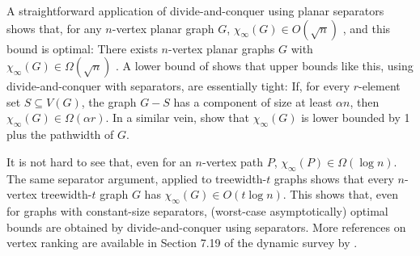 \documentclass[kpfonts]{patmorin}
\theoremstyle{named}
\begin{document}
A straightforward application of divide-and-conquer using planar separators shows that, for any $n$-vertex planar graph $G$, $\chi_\infty(G) \in O(\sqrt{n})$ \cite{llewellyn.tovey.ea:local,katchalski.mccuaig.ea:ordered}, and this bound is optimal:  There exists $n$-vertex planar graphs $G$ with $\chi_\infty(G)\in \Omega(\sqrt{n})$ \cite{katchalski.mccuaig.ea:ordered}.  A lower bound of \citet{katchalski.mccuaig.ea:ordered} shows that upper bounds like this, using divide-and-conquer with separators, are essentially tight: If, for every $r$-element set $S\subseteq V(G)$, the graph $G-S$ has a component of size at least $\alpha n$, then $\chi_\infty(G) \in\Omega(\alpha r)$. In a similar vein, \citet{bodlaender.gilbert.ea:approximating,kloks:treewidth} show that $\chi_\infty(G)$ is lower bounded by 1 plus the pathwidth of $G$.

It is not hard to see that, even for an $n$-vertex path $P$, $\chi_\infty(P)\in\Omega(\log n)$.  The same separator argument, applied to treewidth-$t$ graphs shows that every $n$-vertex treewidth-$t$ graph $G$ has $\chi_\infty(G)\in O(t\log n)$.  This shows that, even for graphs with constant-size separators, (worst-case asymptotically) optimal bounds are obtained by divide-and-conquer using separators.  More references on vertex ranking are available in Section 7.19 of the dynamic survey by \citet{gallian:dynamic}.
\end{document}
